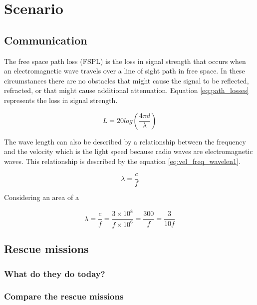 \chapter{Scenario}\label{ch:scenario}

\section{Communication}


The free space path loss (FSPL) is the loss in signal strength that occurs when an electromagnetic wave travels over a line of sight path in free space. In these circumstances there are no obstacles that might cause the signal to be reflected, refracted, or that might cause additional attenuation. Equation \ref{eq:path_losses} represents the loss in signal strength.

\begin{equation}\label{eq:path_losses}
L = 20log\left (\frac{4\pi d}{\lambda} \right)
\end{equation}

The wave length can also be described by a relationship between the frequency and the velocity which is the light speed because radio waves are electromagnetic waves. This relationship is described by the equation \ref{eq:vel_freq_wavelen1}.

\begin{equation}\label{eq:vel_freq_wavelen1}
\lambda = \frac{c}{f}
\end{equation}

Considering an area of a 

\begin{equation}\label{eq:vel_freq_wavelen2}
\lambda = \frac{c}{f} = \frac{3\times 10^{8}}{f\times 10^{6}}=\frac{300}{f}=\frac{3}{10f}
\end{equation}

\section{Rescue missions}
\subsection{What do they do today?}
\subsection{Compare the rescue missions}

